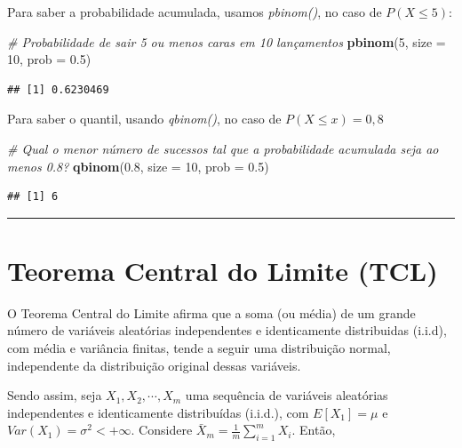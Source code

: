 \documentclass[
]{book}
\newenvironment{Shaded}{\begin{snugshade}}{\end{snugshade}}
\newcommand{\AttributeTok}[1]{\textcolor[rgb]{0.13,0.29,0.53}{#1}}
\newcommand{\CommentTok}[1]{\textcolor[rgb]{0.56,0.35,0.01}{\textit{#1}}}
\newcommand{\DecValTok}[1]{\textcolor[rgb]{0.00,0.00,0.81}{#1}}
\newcommand{\FloatTok}[1]{\textcolor[rgb]{0.00,0.00,0.81}{#1}}
\newcommand{\FunctionTok}[1]{\textcolor[rgb]{0.13,0.29,0.53}{\textbf{#1}}}
\newcommand{\NormalTok}[1]{#1}
\begin{document}
Para saber a probabilidade acumulada, usamos \emph{pbinom()}, no caso de \(P(X \leq 5)\):

\begin{Shaded}
\begin{Highlighting}[]
\CommentTok{\# Probabilidade de sair 5 ou menos caras em 10 lançamentos}
\FunctionTok{pbinom}\NormalTok{(}\DecValTok{5}\NormalTok{, }\AttributeTok{size =} \DecValTok{10}\NormalTok{, }\AttributeTok{prob =} \FloatTok{0.5}\NormalTok{)}
\end{Highlighting}
\end{Shaded}

\begin{verbatim}
## [1] 0.6230469
\end{verbatim}

Para saber o quantil, usando \emph{qbinom()}, no caso de \(P(X \leq x) = 0,8\)

\begin{Shaded}
\begin{Highlighting}[]
\CommentTok{\# Qual o menor número de sucessos tal que a probabilidade acumulada seja ao menos 0.8?}
\FunctionTok{qbinom}\NormalTok{(}\FloatTok{0.8}\NormalTok{, }\AttributeTok{size =} \DecValTok{10}\NormalTok{, }\AttributeTok{prob =} \FloatTok{0.5}\NormalTok{)}
\end{Highlighting}
\end{Shaded}

\begin{verbatim}
## [1] 6
\end{verbatim}

\begin{center}\rule{0.5\linewidth}{0.5pt}\end{center}

\section{Teorema Central do Limite (TCL)}\label{teorema-central-do-limite-tcl}

O Teorema Central do Limite afirma que a soma (ou média) de um grande número de variáveis aleatórias independentes e identicamente distribuidas (i.i.d), com média e variância finitas, tende a seguir uma distribuição normal, independente da distribuição original dessas variáveis.

Sendo assim, seja \(X_1, X_2, \cdots, X_m\) uma sequência de variáveis aleatórias independentes e identicamente distribuídas (i.i.d.), com \(E[X_1]=\mu\) e \(Var(X_1)=\sigma^2<+\infty\). Considere \(\bar{X}_m = \frac{1}{m}\sum_{i=1}^mX_i\). Então,
\end{document}
